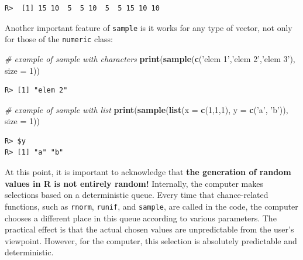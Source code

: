 \documentclass[
  12pt,
]{book}
\newenvironment{Shaded}{\begin{snugshade}}{\end{snugshade}}
\newcommand{\CommentTok}[1]{\textcolor[rgb]{0.37,0.37,0.37}{\textit{#1}}}
\newcommand{\DataTypeTok}[1]{\textcolor[rgb]{0.27,0.27,0.27}{#1}}
\newcommand{\DecValTok}[1]{\textcolor[rgb]{0.06,0.06,0.06}{#1}}
\newcommand{\KeywordTok}[1]{\textcolor[rgb]{0.27,0.27,0.27}{\textbf{#1}}}
\newcommand{\NormalTok}[1]{#1}
\newcommand{\StringTok}[1]{\textcolor[rgb]{0.5,0.5,0.5}{#1}}
\begin{document}
\begin{verbatim}
R>  [1] 15 10  5  5 10  5  5 15 10 10
\end{verbatim}

Another important feature of \texttt{sample} is it works for any type of vector, not only for those of the \texttt{numeric} class:

\begin{Shaded}
\begin{Highlighting}[]
\CommentTok{# example of sample with characters}
\KeywordTok{print}\NormalTok{(}\KeywordTok{sample}\NormalTok{(}\KeywordTok{c}\NormalTok{(}\StringTok{'elem 1'}\NormalTok{,}\StringTok{'elem 2'}\NormalTok{,}\StringTok{'elem 3'}\NormalTok{),}
             \DataTypeTok{size =} \DecValTok{1}\NormalTok{))}
\end{Highlighting}
\end{Shaded}

\begin{verbatim}
R> [1] "elem 2"
\end{verbatim}

\begin{Shaded}
\begin{Highlighting}[]
\CommentTok{# example of sample with list}
\KeywordTok{print}\NormalTok{(}\KeywordTok{sample}\NormalTok{(}\KeywordTok{list}\NormalTok{(}\DataTypeTok{x =} \KeywordTok{c}\NormalTok{(}\DecValTok{1}\NormalTok{,}\DecValTok{1}\NormalTok{,}\DecValTok{1}\NormalTok{),}
                  \DataTypeTok{y =} \KeywordTok{c}\NormalTok{(}\StringTok{'a'}\NormalTok{, }\StringTok{'b'}\NormalTok{)),}
             \DataTypeTok{size =} \DecValTok{1}\NormalTok{))}
\end{Highlighting}
\end{Shaded}

\begin{verbatim}
R> $y
R> [1] "a" "b"
\end{verbatim}

At this point, it is important to acknowledge that \textbf{the generation of random values in R is not entirely random!} Internally, the computer makes selections based on a deterministic queue. Every time that chance-related functions, such as \texttt{rnorm}, \texttt{runif}, and \texttt{sample}, are called in the code, the computer chooses a different place in this queue according to various parameters. The practical effect is that the actual chosen values are unpredictable from the user's viewpoint. However, for the computer, this selection is absolutely predictable and deterministic.
\end{document}
